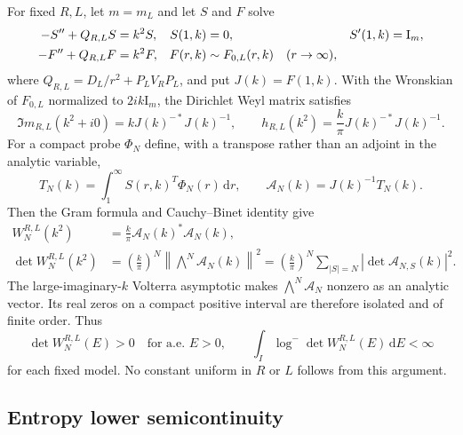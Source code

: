 \documentclass[11pt]{article}
\newcommand{\Id}{\mathrm I}
\newcommand{\dd}{\,\mathrm d}
\newcommand{\wedgeN}{\bigwedge\nolimits^N}
\theoremstyle{definition}
\theoremstyle{remark}
\begin{document}
For fixed $R,L$, let $m=m_L$ and let $S$ and $F$ solve
\begin{align}
 -S''+Q_{R,L}S&=k^2S,
 &S(1,k)&=0,&S'(1,k)&=\Id_m,\notag\\
 -F''+Q_{R,L}F&=k^2F,
 &F(r,k)&\sim F_{0,L}(r,k)\quad(r\to\infty),
 \label{eq:audit-fundamental-solutions}
\end{align}
where $Q_{R,L}=D_L/r^2+P_LV_RP_L$, and put $J(k)=F(1,k)$.  With the Wronskian of $F_{0,L}$ normalized to $2ik\Id_m$, the Dirichlet Weyl matrix satisfies
\begin{equation}
 \Im m_{R,L}(k^2+i0)
 =kJ(k)^{-*}J(k)^{-1},
 \qquad
 h_{R,L}(k^2)=\frac{k}{\pi}J(k)^{-*}J(k)^{-1}.
 \label{eq:audit-jost-density}
\end{equation}
For a compact probe $\Phi_N$ define, with a transpose rather than an adjoint in the analytic variable,
\begin{equation}
 T_N(k)=\int_1^\infty S(r,k)^T\Phi_N(r)\dd r,
 \qquad
 \mathcal A_N(k)=J(k)^{-1}T_N(k).
 \label{eq:audit-regular-transform}
\end{equation}
Then the Gram formula and Cauchy--Binet identity give
\begin{align}
 W_N^{R,L}(k^2)
 &=\frac{k}{\pi}\mathcal A_N(k)^*\mathcal A_N(k),
 \label{eq:audit-probe-density}\\
 \det W_N^{R,L}(k^2)
 &=\left(\frac{k}{\pi}\right)^N
   \left\|\wedgeN\mathcal A_N(k)\right\|^2
 =\left(\frac{k}{\pi}\right)^N
   \sum_{|S|=N}|\det\mathcal A_{N,S}(k)|^2.
 \label{eq:audit-gram-determinant}
\end{align}
The large-imaginary-$k$ Volterra asymptotic makes $\wedgeN\mathcal A_N$ nonzero as an analytic vector.  Its real zeros on a compact positive interval are therefore isolated and of finite order.  Thus
\begin{equation}
 \det W_N^{R,L}(E)>0\quad\text{for a.e. }E>0,
 \qquad
 \int_I\log^-\det W_N^{R,L}(E)\dd E<\infty
 \label{eq:audit-finite-entropy}
\end{equation}
for each fixed model.  No constant uniform in $R$ or $L$ follows from this argument.

\subsection{Entropy lower semicontinuity}
\end{document}
